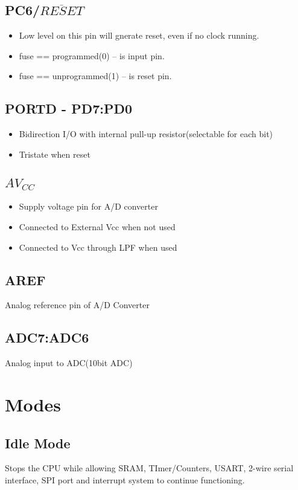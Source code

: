\documentclass{article}
\begin{document}
\subsection{PC6/\texorpdfstring{$\overline{RESET}$}{}}
\begin{itemize}
    \item Low level on this pin will gnerate reset, even if no clock running.
    \item {} fuse == programmed(0) --  is input pin.
    \item {} fuse == unprogrammed(1) --  is reset pin.
\end{itemize}

\subsection{PORTD - PD7:PD0}
\begin{itemize}
    \item Bidirection I/O with internal pull-up resistor(selectable for each bit)
    \item Tristate when reset
\end{itemize}

\subsection{\texorpdfstring{$AV_{CC}$}{}}
\begin{itemize}
    \item Supply voltage pin for A/D converter
    \item Connected to External Vcc when not used
    \item Connected to Vcc through LPF when used
\end{itemize}

\subsection{AREF}
\quad Analog reference pin of A/D Converter

\subsection{ADC7:ADC6}
\quad Analog input to ADC(10bit ADC)


\section{Modes}
\subsection{Idle Mode}
\quad Stops the CPU while allowing SRAM, TImer/Counters, USART, 2-wire serial interface, SPI port and interrupt system to continue functioning.
\end{document}
